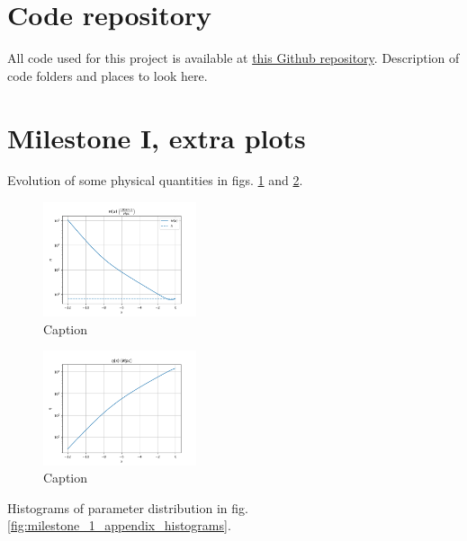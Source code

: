 \begin{appendix}

\FloatBarrier
\section{Code repository}
All code used for this project is available at \href{https://github.com/ericludvigs/AST5220_Cosmology_Project}{this Github repository}.
Description of code folders and places to look here.

\FloatBarrier
\section{Milestone I, extra plots}\label{app:milestone_1_extra_plots}

Evolution of some physical quantities in figs. \ref{fig:milestone_1_H_prime_of_x} and \ref{fig:milestone_1_eta_of_x}.

\begin{figure}[h!tb]
\centering
\includegraphics[width=0.4\textwidth]{../Milestone 1/Plots/H_prime_of_x.png}
\caption{Caption}
\label{fig:milestone_1_H_prime_of_x}
\end{figure}

\begin{figure}[h!bt]
\centering
\includegraphics[width=0.4\textwidth]{../Milestone 1/Plots/eta_of_x.png}
\caption{Caption}
\label{fig:milestone_1_eta_of_x}
\end{figure}

Histograms of parameter distribution in fig. \ref{fig:milestone_1_appendix_histograms}.


\end{appendix}
